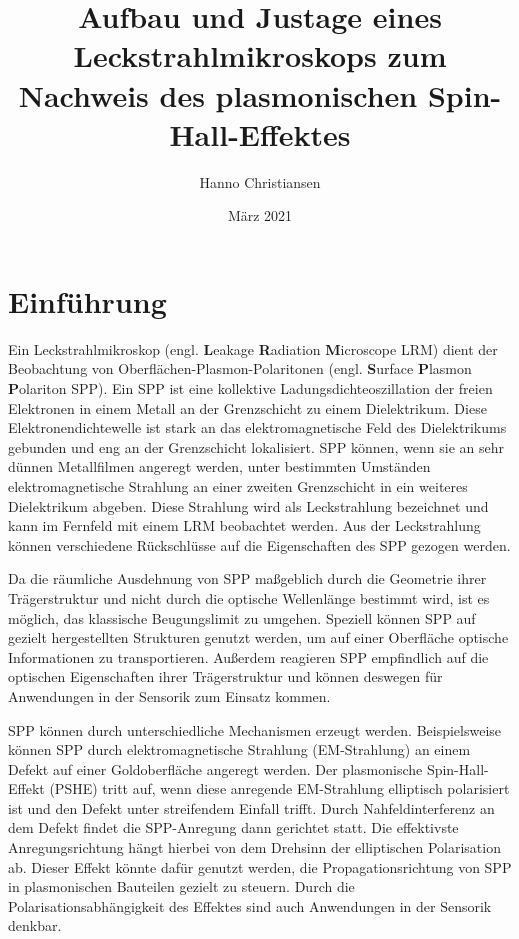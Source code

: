 \documentclass[titlepage]{article}
\title{Aufbau und Justage eines Leckstrahlmikroskops zum Nachweis des plasmonischen Spin-Hall-Effektes}
\author{Hanno Christiansen}
\date{März 2021}
\begin{document}
	
	\maketitle
	\tableofcontents
	\newpage
	\listoffigures 
	\newpage
	
	\section{Einführung}
	Ein Leckstrahlmikroskop (engl. \textbf{L}eakage \textbf{R}adiation \textbf{M}icroscope LRM) dient der Beobachtung von Oberflächen-Plasmon-Polaritonen (engl. \textbf{S}urface \textbf{P}lasmon \textbf{P}olariton SPP). Ein SPP ist eine kollektive Ladungsdichteoszillation der freien Elektronen in einem Metall an der Grenzschicht zu einem Dielektrikum. Diese Elektronendichtewelle ist stark an das elektromagnetische Feld des Dielektrikums gebunden und eng an der Grenzschicht lokalisiert. SPP können, wenn sie an sehr dünnen Metallfilmen angeregt werden, unter bestimmten Umständen elektromagnetische Strahlung an einer zweiten Grenzschicht in ein weiteres Dielektrikum abgeben. Diese Strahlung wird als Leckstrahlung bezeichnet und kann im Fernfeld mit einem LRM beobachtet werden. Aus der Leckstrahlung können verschiedene Rückschlüsse auf die Eigenschaften des SPP gezogen werden.\cite{Drezet.2008}
	
	Da die räumliche Ausdehnung von SPP maßgeblich durch die Geometrie ihrer Trägerstruktur und nicht durch die optische Wellenlänge bestimmt wird, ist es möglich, das klassische Beugungslimit zu umgehen. Speziell können SPP auf gezielt hergestellten Strukturen genutzt werden, um auf einer Oberfläche optische Informationen zu transportieren. Außerdem reagieren SPP empfindlich auf die optischen Eigenschaften ihrer Trägerstruktur und können deswegen für Anwendungen in der Sensorik zum Einsatz kommen.\cite{Lin.2013}
	
	SPP können durch unterschiedliche Mechanismen erzeugt werden. Beispielsweise können SPP durch elektromagnetische Strahlung (EM-Strahlung) an einem Defekt auf einer Goldoberfläche angeregt werden. Der plasmonische Spin-Hall-Effekt (PSHE) tritt auf, wenn diese anregende EM-Strahlung elliptisch polarisiert ist und den Defekt unter streifendem Einfall trifft. Durch Nahfeldinterferenz an dem Defekt findet die SPP-Anregung dann gerichtet statt. Die effektivste Anregungsrichtung hängt hierbei von dem Drehsinn der elliptischen Polarisation ab. Dieser Effekt könnte dafür genutzt werden, die Propagationsrichtung von SPP in plasmonischen Bauteilen gezielt zu steuern. Durch die Polarisationsabhängigkeit des Effektes sind auch Anwendungen in der Sensorik denkbar.\cite{RodriguezFortuno.2013}
	
\end{document}

